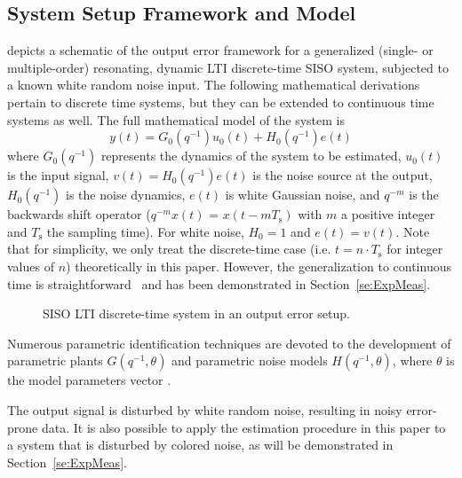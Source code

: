 \subsection{System Setup Framework and Model}
 depicts a schematic of the output error framework for  a generalized (single- or multiple-order) resonating, dynamic LTI discrete-time SISO system, subjected to a known white random noise input. The following mathematical derivations pertain to discrete time systems, but they can be extended to continuous time systems as well. The full mathematical model of the system is
\begin{equation}\label{lpmtd1}
y(t)=G_0(q^{-1})u_0(t)+H_0(q^{-1})e(t)
\end{equation}
where $G_0(q^{-1})$ represents the dynamics of the system to be estimated, $u_0(t)$ is the input signal, $v(t)= H_0(q^{-1})e(t)$ is the noise source at the output, $H_0(q^{-1})$ is the noise dynamics, 
$e(t)$ is white Gaussian noise, and $q^{-m}$ is the backwards shift operator ($q^{-m}x(t)$ = $x(t-mT_{\mathrm{s}})$  with $m$ a positive integer and $T_{\mathrm{s}}$ the sampling time).
For white noise, $H_0 = 1$ and $e(t) = v(t)$.
Note that for simplicity, we only treat the discrete-time case (i.e. $t = n \cdot T_{\mathrm{s}}$ for integer values of $n$) theoretically in this paper.
However, the generalization to continuous time is straightforward~\citep[Chapter 6]{Pintelon2012} and has been demonstrated in Section~\ref{se:ExpMeas}.

\begin{figure}[tbh] %
\centering

\caption[Output-error set-up.]{SISO LTI discrete-time system in an output error setup.}
\label{fig:oesetup}
\end{figure}

Numerous parametric identification techniques are devoted to the development of parametric plants $G(q^{-1},\theta)$ and parametric noise models  $H(q^{-1},\theta)$, where  $\theta$ is the model parameters vector  \citep{Ljung1999,Soderstrom1989}.

The output signal is disturbed by white random noise, resulting in noisy error-prone data. It is also possible to apply the estimation procedure in this paper to a system that is disturbed by colored noise, as will be demonstrated in Section~\ref{se:ExpMeas}. 

